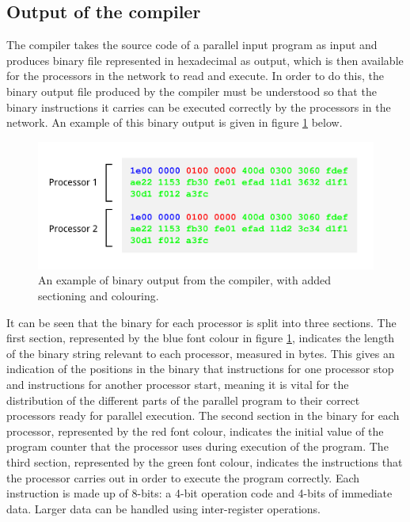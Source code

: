 \documentclass[a4paper, 12pt]{article}
\begin{document}
\subsection{Output of the compiler}

The compiler takes the source code of a parallel input program as input and produces binary file represented in hexadecimal as output, which is then available for the processors in the network to read and execute. In order to do this, the binary output file produced by the compiler must be understood so that the binary instructions it carries can be executed correctly by the processors in the network. An example of this binary output is given in figure \ref{fig:compiler_binary} below.


\begin{figure}[H]
\centering
\includegraphics[width=15cm]{compiler_binary.png}
\caption[An example of binary output from the compiler]{An example of binary output from the compiler, with added sectioning and colouring.}
\label{fig:compiler_binary}
\end{figure}

It can be seen that the binary for each processor is split into three sections. The first section, represented by the blue font colour in figure \ref{fig:compiler_binary}, indicates the length of the binary string relevant to each processor, measured in bytes. This gives an indication of the positions in the binary that instructions for one processor stop and instructions for another processor start, meaning it is vital for the distribution of the different parts of the parallel program to their correct processors ready for parallel execution. The second section in the binary for each processor, represented by the red font colour, indicates the initial value of the program counter that the processor uses during execution of the program. The third section, represented by the green font colour, indicates the instructions that the processor carries out in order to execute the program correctly. Each instruction is made up of 8-bits: a 4-bit operation code and 4-bits of immediate data. Larger data can be handled using inter-register operations. 
\end{document}
